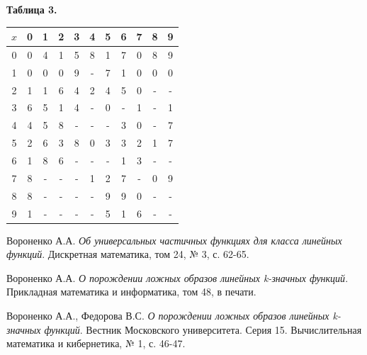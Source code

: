 \documentclass[oneside,final,14pt]{extreport}
\begin{document}
\centerline{\bf Таблица 3.}
\begin{center}
\begin{tabular}{|c|c|c|c|c|c|c|c|c|c|c|}
\hline \(x\) & 0 & 1 & 2 & 3 & 4 & 5 & 6 & 7 & 8 & 9 \\ \hline
0 & 0 & 4 & 1 & 5 & 8 & 1 & 7 & 0 & 8 & 9 \\ \hline 
1 & 0 & 0 & 0 & 9 & - & 7 & 1 & 0 & 0 & 0 \\ \hline 
2 & 1 & 1 & 6 & 4 & 2 & 4 & 5 & 0 & - & - \\ \hline 
3 & 6 & 5 & 1 & 4 & - & 0 & - & 1 & - & 1 \\ \hline 
4 & 4 & 5 & 8 & - & - & - & 3 & 0 & - & 7 \\ \hline 
5 & 2 & 6 & 3 & 8 & 0 & 3 & 3 & 2 & 1 & 7 \\ \hline 
6 & 1 & 8 & 6 & - & - & - & 1 & 3 & - & - \\ \hline 
7 & 8 & - & - & - & 1 & 2 & 7 & - & 0 & 9 \\ \hline 
8 & 8 & - & - & - & - & 9 & 9 & 0 & - & - \\ \hline 
9 & 1 & - & - & - & - & 5 & 1 & 6 & - & - \\ \hline 
\end{tabular}
\end{center}


\begin{thebibliography}{0}

 Вороненко А.А. \emph{Об универсальных частичных функциях для класса линейных функций}. 
Дискретная математика, том 24, № 3, с. 62-65.
 
 Вороненко А.А. \emph{О порождении ложных образов линейных k-значных функций}. 
Прикладная математика и информатика, том 48, в печати.

 Вороненко А.А., Федорова В.С. \emph{О порождении ложных образов линейных k-значных функций}.
Вестник Московского университета. Серия 15. Вычислительная математика и кибернетика, № 1, с. 46-47.

\end{thebibliography}
\end{document}
